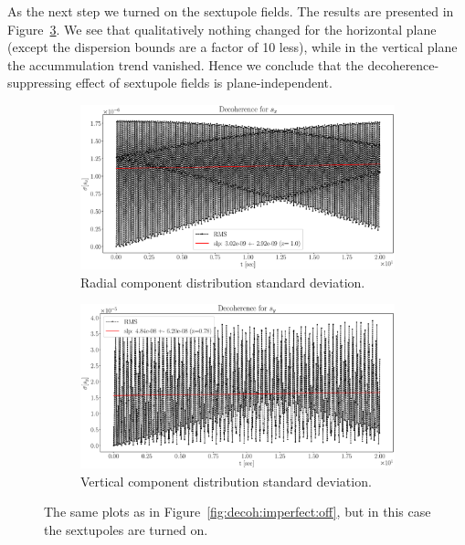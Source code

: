 \documentclass[]{elsarticle}
\begin{document}
As the next step we turned on the sextupole fields.
The results are presented in Figure~\ref{fig:decoh:imperfect:on}.
We see that qualitatively nothing changed for the horizontal plane (except the dispersion bounds are
a factor of 10 less), while in the vertical plane the accummulation trend vanished. Hence we conclude
that the decoherence-suppressing effect of sextupole fields is plane-independent.
\begin{figure}[h]\centering
  \begin{subfigure}{\linewidth}
    \includegraphics[width=\linewidth]{img/decoh/SX_decoh_20sec_opt.eps}
      \caption{Radial component distribution standard deviation.\label{fig:decoh:imperfect:on:hor}}
  \end{subfigure}
  \begin{subfigure}{\linewidth}
    \includegraphics[width=\linewidth]{img/decoh/SY_decoh_20sec_opt.eps}
    \caption{Vertical component distribution standard deviation.\label{fig:decoh:imperfect:on:vert}}
  \end{subfigure}
  \caption{The same plots as in Figure~\ref{fig:decoh:imperfect:off}, but in this case the
    sextupoles are turned on.\label{fig:decoh:imperfect:on}}
\end{figure}
\end{document}
